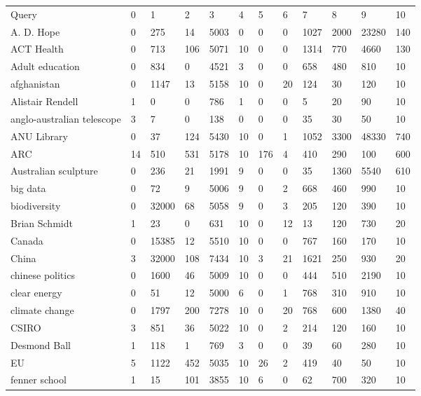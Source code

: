 \documentclass[5pt]{article}
\begin{document}
\begin{table}
\begin{tabular*}{0.5\textwidth}{|p{5cm}|l|l|l|l|l|l|l|l|l|l|l|}
\cline{1-12}
Query	& 0 & 1 & 2 & 3 & 4 & 5 & 6 & 7 & 8 & 9 & 10 \\\cline{1-12}
A. D. Hope &0 &275 &14 &5003 &0 &0 &0 &1027 &2000 &23280 &140\\
\cline{1-12}
ACT Health &0 &713 &106 &5071 &10 &0 &0 &1314 &770 &4660 &130\\
\cline{1-12}
Adult education &0 &834 &0 &4521 &3 &0 &0 &658 &480 &810 &10\\
\cline{1-12}
afghanistan &0 &1147 &13 &5158 &10 &0 &20 &124 &30 &120 &10\\
\cline{1-12}
Alistair Rendell &1 &0 &0 &786 &1 &0 &0 &5 &20 &90 &10\\
\cline{1-12}
anglo-australian telescope &3 &7 &0 &138 &0 &0 &0 &35 &30 &50 &10\\
\cline{1-12}
ANU Library &0 &37 &124 &5430 &10 &0 &1 &1052 &3300 &48330 &740\\
\cline{1-12}
ARC &14 &510 &531 &5178 &10 &176 &4 &410 &290 &100 &600\\
\cline{1-12}
Australian sculpture &0 &236 &21 &1991 &9 &0 &0 &35 &1360 &5540 &610\\
\cline{1-12}
big data &0 &72 &9 &5006 &9 &0 &2 &668 &460 &990 &10\\
\cline{1-12}
biodiversity &0 &32000 &68 &5058 &9 &0 &3 &205 &120 &390 &10\\
\cline{1-12}
Brian Schmidt &1 &23 &0 &631 &10 &0 &12 &13 &120 &730 &20\\
\cline{1-12}
Canada &0 &15385 &12 &5510 &10 &0 &0 &767 &160 &170 &10\\
\cline{1-12}
China &3 &32000 &108 &7434 &10 &3 &21 &1621 &250 &930 &20\\
\cline{1-12}
chinese politics &0 &1600 &46 &5009 &10 &0 &0 &444 &510 &2190 &10\\
\cline{1-12}
clear energy &0 &51 &12 &5000 &6 &0 &1 &768 &310 &910 &10\\
\cline{1-12}
climate change &0 &1797 &200 &7278 &10 &0 &20 &768 &600 &1380 &40\\
\cline{1-12}
CSIRO &3 &851 &36 &5022 &10 &0 &2 &214 &120 &160 &10\\
\cline{1-12}
Desmond Ball &1 &118 &1 &769 &3 &0 &0 &39 &60 &280 &10\\
\cline{1-12}
EU &5 &1122 &452 &5035 &10 &26 &2 &419 &40 &50 &10\\
\cline{1-12}
fenner school &1 &15 &101 &3855 &10 &6 &0 &62 &700 &320 &10\\

\end{tabular*}
\end{table}
\end{document}
